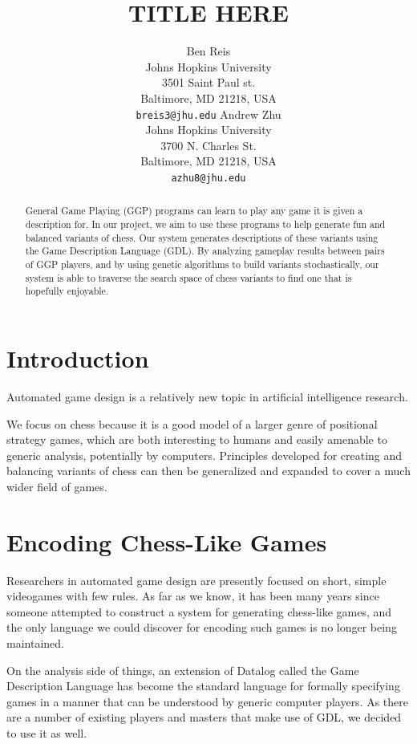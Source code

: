 \documentclass[11pt,letterpaper]{article}
\title{TITLE HERE}
\author{Ben Reis \\
  Johns Hopkins University\\
  3501 Saint Paul st.\\
  Baltimore, MD 21218, USA\\
  {\tt breis3@jhu.edu}
  \And
  Andrew Zhu \\
  Johns Hopkins University \\
  3700 N. Charles St. \\
  Baltimore, MD 21218, USA\\
  {\tt azhu8@jhu.edu}}
\date{}
\begin{document}
\maketitle
\begin{abstract}
General Game Playing (GGP) programs can learn to play any game it is given a description for. In our project, we aim to use these programs to help generate fun and balanced variants of chess. Our system generates descriptions of these variants using the Game Description Language (GDL). By analyzing gameplay results between pairs of GGP players, and by using genetic algorithms to build variants stochastically, our system is able to traverse the search space of chess variants to find one that is hopefully enjoyable.
\end{abstract}

\section{Introduction}
Automated game design is a relatively new topic in artificial intelligence
research. %


We focus on chess because it is a good model of a larger genre of positional
strategy games, which are both interesting to humans and easily amenable to
generic analysis, potentially by computers. Principles developed for creating
and balancing variants of chess can then be generalized and expanded to cover
a much wider field of games.

\section{Encoding Chess-Like Games}
Researchers in automated game design are presently focused on short, simple
videogames with few rules. As far as we know, it has been many years since
someone attempted to construct a system for generating chess-like games, and the
only language we could discover for encoding such games is no longer being
maintained.

On the analysis side of things, an extension of Datalog called the Game
Description Language has become the standard language for formally specifying
games in a manner that can be understood by generic computer players. As there
are a number of existing players and masters that make use of GDL, we decided to
use it as well.
\end{document}
